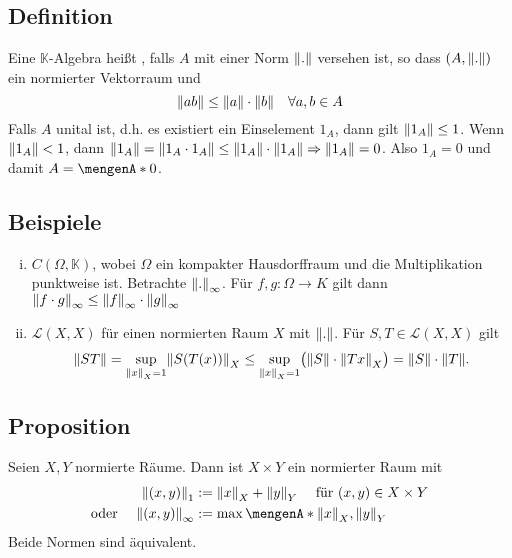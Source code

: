 \subsection[Definition: Normierte $\mathds{K}$-Algebra]{Definition} %
\label{sub:210}
Eine $\mathds{K}$-Algebra heißt , falls $A$ mit einer Norm $\norm{.}$ versehen ist, so dass $(A,\norm{.} )$ ein normierter Vektorraum und
\[
	\norm{a b} \le \norm{a} \cdot \norm{b} \quad \forall a,b \in A   
\]
Falls $A$ unital ist, d.h. es existiert ein Einselement $1_A$, dann gilt $\norm{1_A} \le 1$.
Wenn $\norm{1_A} < 1$, dann $\norm{1_A} = \norm{1_A \cdot 1_A} \le \norm{1_A} \cdot \norm{1_A} \Rightarrow \norm{1_A} =0 $. Also $1_A=0$ und damit $A= \set{0}$.

\subsection[Beispiele für normierte Algebren]{Beispiele} %
\label{sub:211}
\begin{enumerate}[(i)]
	\item $C(\Omega,\mathds{K})$, wobei $\Omega$ ein kompakter Hausdorffraum und die Multiplikation punktweise ist. Betrachte $\norm[\infty]{.}$. Für $f,g : \Omega \to K$ gilt dann
	$\norm[\infty]{f \cdot g} \le \norm[\infty]{f} \cdot \norm[\infty]{g}$
	\item $\mathcal{L}(X,X)$ für einen normierten Raum $X$ mit $\norm{.}$. Für $S,T \in \mathcal{L}(X,X)$ gilt
	\[
		\norm{S T} = \sup_{\norm[X]{x}=1} \norm[X]{S(T(x))} \le \sup_{\norm[X]{x}=1} \enbrace[\big]{\norm{S} \cdot \norm[X]{Tx}} = \norm{S} \cdot \norm{T}.     
	\]
\end{enumerate}

\subsection[Proposition: Norm auf dem Produkt normierter Räume]{Proposition} %
\label{sub:212}
Seien $X,Y$ normierte Räume. Dann ist $X \times Y$ ein normierter Raum mit 
\begin{align*}
	 \norm[1]{(x,y)} &:= \norm[X]{x} + \norm[Y]{y}   \quad \text{ für } (x,y) \in X \times Y \\
	\text{oder } \quad \norm[\infty]{(x,y)} &:= \max \set{\norm[X]{x}, \norm[Y]{y}}  
\end{align*}
Beide Normen sind äquivalent.

